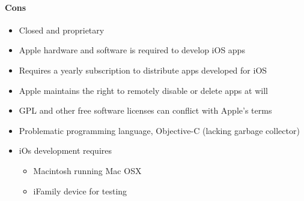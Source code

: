 	\paragraph{Cons}
		\begin{itemize}
			\item Closed and proprietary
			\item Apple hardware and software is required to develop iOS apps
			\item Requires a yearly subscription to distribute apps developed
			for iOS
			\item Apple maintains the right to remotely disable or delete apps
			at will
			\item GPL and other free software licenses can conflict with
			Apple's terms
			\item Problematic programming language, Objective-C (lacking garbage collector)
		\end{itemize}

	\begin{itemize}
		\item iOs development requires
			\begin{itemize}
				\item Macintosh running Mac OSX
				\item iFamily device for testing
			\end{itemize}
	\end{itemize}



